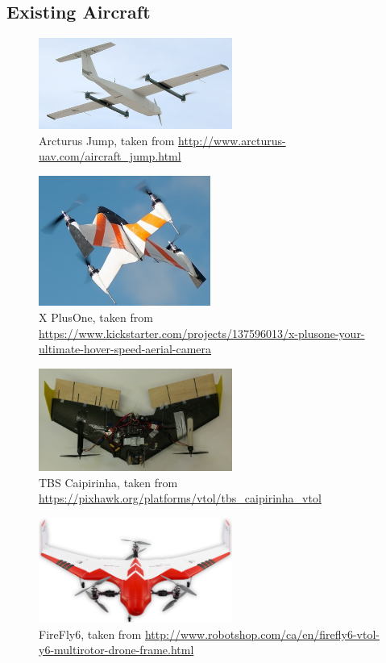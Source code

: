 \subsection*{Existing Aircraft}
\begin{figure}[!h]
	\centering
	\includegraphics[width=180pt]{Images/Aircraft/arcturus}
	\caption{Arcturus Jump, taken from \url{http://www.arcturus-uav.com/aircraft_jump.html}}
	\label{fig:arcturus}
\end{figure}

\begin{figure}[!h]
	\centering
	\includegraphics[width=160pt]{Images/Aircraft/xplusone}
	\caption[caption]{X PlusOne, taken from\\ \url{https://www.kickstarter.com/projects/137596013/x-plusone-your-ultimate-hover-speed-aerial-camera}}
	\label{fig:xplusone}
\end{figure}

\begin{figure}[!h]
	\centering
	\includegraphics[width=180pt]{Images/Aircraft/caipirinha}
	\caption{TBS Caipirinha, taken from \url{https://pixhawk.org/platforms/vtol/tbs_caipirinha_vtol}}
	\label{fig:caipirinha}
\end{figure}

\begin{figure}[!h]
	\centering
	\includegraphics[width=180pt]{Images/Aircraft/firefly6}
	\caption{FireFly6, taken from \url{http://www.robotshop.com/ca/en/firefly6-vtol-y6-multirotor-drone-frame.html}}
	\label{fig:firefly}
\end{figure}


